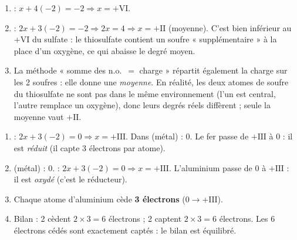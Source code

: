 \documentclass[11pt,a4paper]{article}
\begin{document}
\begin{corrige}
\begin{enumerate}[label=\alph*),leftmargin=1.8em,topsep=2pt,itemsep=1.5pt]
  \item {} : $x + 4(-2) = -2 \Rightarrow x = +\mathrm{VI}$.
  \item {} : $2x + 3(-2) = -2 \Rightarrow 2x = 4 \Rightarrow x = +\mathrm{II}$ (moyenne). C'est bien
        inférieur au $+\mathrm{VI}$ du sulfate : le thiosulfate contient un soufre « supplémentaire » à la
        place d'un oxygène, ce qui abaisse le degré moyen.
  \item La méthode « somme des n.o.\ $=$ charge » répartit également la charge sur les 2 soufres : elle donne
        une \emph{moyenne}. En réalité, les deux atomes de soufre du thiosulfate ne sont pas dans le même
        environnement (l'un est central, l'autre remplace un oxygène), donc leurs degrés réels diffèrent ;
        seule la moyenne vaut $+\mathrm{II}$.
\end{enumerate}
\end{corrige}

\begin{corrige}
\begin{enumerate}[label=\alph*),leftmargin=1.8em,topsep=2pt,itemsep=1.5pt]
  \item {} : $2x + 3(-2)=0 \Rightarrow x = +\mathrm{III}$. Dans  (métal) : $0$.
        Le fer passe de $+\mathrm{III}$ à $0$ : il est \emph{réduit} (il capte 3 électrons par atome).
  \item {} (métal) : $0$.  : $2x + 3(-2)=0 \Rightarrow x=+\mathrm{III}$.
        L'aluminium passe de $0$ à $+\mathrm{III}$ : il est \emph{oxydé} (c'est le réducteur).
  \item Chaque atome d'aluminium cède \textbf{3 électrons} ($0 \to +\mathrm{III}$).
  \item Bilan : 2  cèdent $2\times3 = 6$ électrons ; 2  captent $2\times3 = 6$ électrons.
        Les 6 électrons cédés sont exactement captés : le bilan est équilibré.
\end{enumerate}
\end{corrige}
\end{document}

